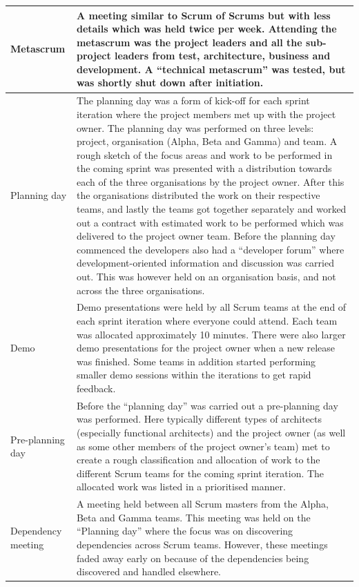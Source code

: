 \begin{center}
\begin{longtable}{| p{3.5cm} | p{8cm} |}
    Metascrum & A meeting similar to Scrum of Scrums but with less details which was held twice per week. Attending the metascrum was the project leaders and all the sub-project leaders from test, architecture, business and development. A ``technical metascrum'' was tested, but was shortly shut down after initiation. \\ \hline
    Planning day & The planning day was a form of kick-off for each sprint iteration where the project members met up with the project owner. The planning day was performed on three levels: project, organisation (Alpha, Beta and Gamma) and team. A rough sketch of the focus areas and work to be performed in the coming sprint was presented with a distribution towards each of the three organisations by the project owner. After this the organisations distributed the work on their respective teams, and lastly the teams got together separately and worked out a contract with estimated work to be performed which was delivered to the project owner team. Before the planning day commenced the developers also had a ``developer forum'' where development-oriented information and discussion was carried out. This was however held on an organisation basis, and not across the three organisations. \\ \hline
    Demo & Demo presentations were held by all Scrum teams at the end of each sprint iteration where everyone could attend. Each team was allocated approximately 10 minutes. There were also larger demo presentations for the project owner when a new release was finished. Some teams in addition started performing smaller demo sessions within the iterations to get rapid feedback. \\ \hline
    Pre-planning day & Before the ``planning day'' was carried out a pre-planning day was performed. Here typically different types of architects (especially functional architects) and the project owner (as well as some other members of the project owner's team) met to create a rough classification and allocation of work to the different Scrum teams for the coming sprint iteration. The allocated work was listed in a prioritised manner. \\ \hline
    Dependency meeting & A meeting held between all Scrum masters from the Alpha, Beta and Gamma teams. This meeting was held on the ``Planning day'' where the focus was on discovering dependencies across Scrum teams. However, these meetings faded away early on because of the dependencies being discovered and handled elsewhere. \\ \hline

\end{longtable}
\end{center}
